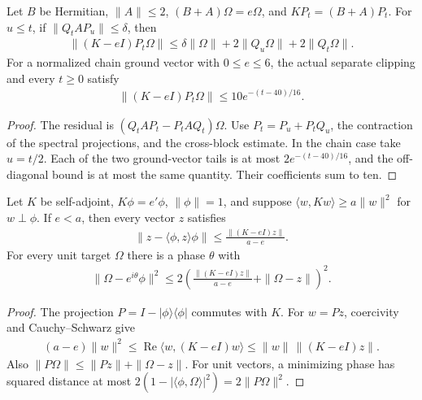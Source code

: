 \begin{lemma}
    \label{lem:aklv_projected_residual}
    \leanok
    Let $B$ be Hermitian, $\|A\|\le2$, $(B+A)\Omega=e\Omega$, and
    $KP_t=(B+A)P_t$. For $u\le t$, if $\|Q_tAP_u\|\le\delta$, then
    \begin{align}
        \|(K-eI)P_t\Omega\|
        \le\delta\|\Omega\|+2\|Q_u\Omega\|+2\|Q_t\Omega\|.
    \end{align}
    For a normalized chain ground vector with $0\le e\le6$, the actual
    separate clipping and every $t\ge0$ satisfy
    \begin{align}
        \|(K-eI)P_t\Omega\|\le10e^{-(t-40)/16}.
    \end{align}
\end{lemma}
\begin{proof}\leanok
    The residual is $(Q_tAP_t-P_tAQ_t)\Omega$. Use
    $P_t=P_u+P_tQ_u$, the contraction of the spectral projections, and
    the cross-block estimate. In the chain case take $u=t/2$.
    Each of the two ground-vector tails is at most
    $2e^{-(t-40)/16}$, and the off-diagonal bound is at most the same
    quantity. Their coefficients sum to ten.
\end{proof}

\begin{lemma}
    \label{lem:aklv_residual_phase}
    \leanok
    Let $K$ be self-adjoint, $K\phi=e'\phi$, $\|\phi\|=1$, and suppose
    $\langle w,Kw\rangle\ge a\|w\|^2$ for $w\perp\phi$.
    If $e<a$, then every vector $z$ satisfies
    \begin{align}
        \|z-\langle\phi,z\rangle\phi\|
        \le\frac{\|(K-eI)z\|}{a-e}.
    \end{align}
    For every unit target $\Omega$ there is a phase $\theta$ with
    \begin{align}
        \|\Omega-e^{i\theta}\phi\|^2
        \le2\left(\frac{\|(K-eI)z\|}{a-e}+\|\Omega-z\|\right)^2.
    \end{align}
\end{lemma}
\begin{proof}\leanok
    The projection $P=I-|\phi\rangle\langle\phi|$ commutes with $K$.
    For $w=Pz$, coercivity and Cauchy--Schwarz give
    \begin{align}
        (a-e)\|w\|^2
        \le\operatorname{Re}\langle w,(K-eI)w\rangle
        \le\|w\|\,\|(K-eI)z\|.
    \end{align}
    Also $\|P\Omega\|\le\|Pz\|+\|\Omega-z\|$. For unit vectors, a
    minimizing phase has squared distance at most
    $2(1-|\langle\phi,\Omega\rangle|^2)=2\|P\Omega\|^2$.
\end{proof}

